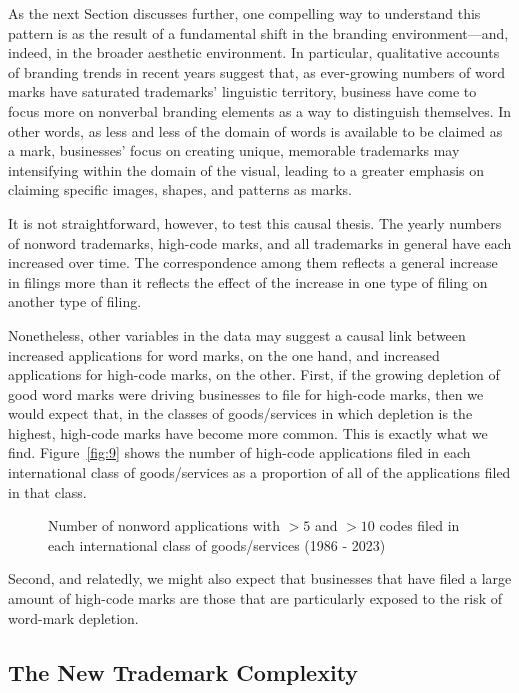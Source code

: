 \documentclass[letterpaper, 11pt, oneside]{article}
\begin{document}
As the next Section discusses further, one compelling way to understand this pattern is as the result of a fundamental shift in the branding environment—and, indeed, in the broader aesthetic environment. In particular, qualitative accounts of branding trends in recent years suggest that, as ever-growing numbers of word marks have saturated trademarks' linguistic territory, business have come to focus more on nonverbal branding elements as a way to distinguish themselves. In other words, as less and less of the domain of words is available to be claimed as a mark, businesses' focus on creating unique, memorable trademarks may intensifying within the domain of the visual, leading to a greater emphasis on claiming specific images, shapes, and patterns as marks.

It is not straightforward, however, to test this causal thesis. The yearly numbers of nonword trademarks, high-code marks, and all trademarks in general have each increased over time. The correspondence among them reflects a general increase in filings more than it reflects the effect of the increase in one type of filing on another type of filing.

Nonetheless, other variables in the data may suggest a causal link between increased applications for word marks, on the one hand, and increased applications for high-code marks, on the other. First, if the growing depletion of good word marks were driving businesses to file for high-code marks, then we would expect that, in the classes of goods/services in which depletion is the highest, high-code marks have become more common. This is exactly what we find. Figure~\ref{fig:9} shows the number of high-code applications filed in each international class of goods/services as a proportion of all of the applications filed in that class.

\begin{figure}[H]
\centering


\caption{\label{fig:12} Number of nonword applications with $>5$ and $>10$ codes filed in each international class of goods/services (1986 - 2023)}
\end{figure}

Second, and relatedly, we might also expect that businesses that have filed a large amount of high-code marks are those that are particularly exposed to the risk of word-mark depletion. 

\subsection{The New Trademark Complexity}\label{subsec:2C}
\end{document}
